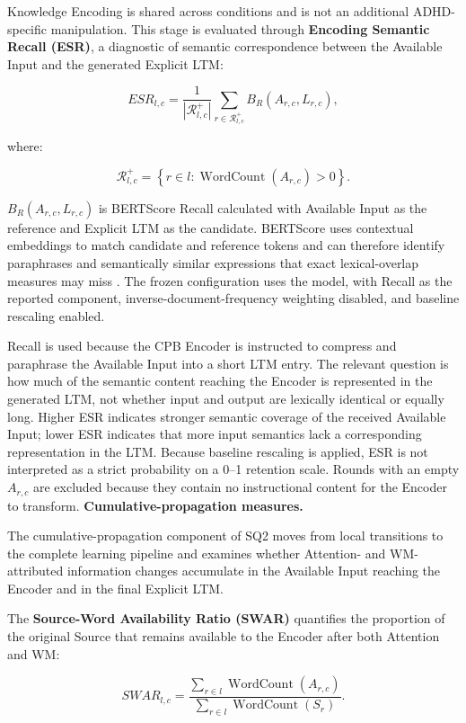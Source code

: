 Knowledge Encoding is shared across conditions and is not an additional ADHD-specific manipulation. This stage is evaluated through \textbf{Encoding Semantic Recall (ESR)}, a diagnostic of semantic correspondence between the Available Input and the generated Explicit LTM:

\[
ESR_{l,c}
=
\frac{1}{|\mathcal R^+_{l,c}|}
\sum_{r\in\mathcal R^+_{l,c}}
B_R(A_{r,c},L_{r,c}),
\]

where:

\[
\mathcal R^+_{l,c}
=
\left\{
r\in l:
\operatorname{WordCount}(A_{r,c})>0
\right\}.
\]

$B_R(A_{r,c},L_{r,c})$ is BERTScore Recall calculated with Available Input as the reference and Explicit LTM as the candidate. BERTScore uses contextual embeddings to match candidate and reference tokens and can therefore identify paraphrases and semantically similar expressions that exact lexical-overlap measures may miss \cite{zhang2019bertscore}. The frozen configuration uses the  model, with Recall as the reported component, inverse-document-frequency weighting disabled, and baseline rescaling enabled.

Recall is used because the CPB Encoder is instructed to compress and paraphrase the Available Input into a short LTM entry. The relevant question is how much of the semantic content reaching the Encoder is represented in the generated LTM, not whether input and output are lexically identical or equally long. Higher ESR indicates stronger semantic coverage of the received Available Input; lower ESR indicates that more input semantics lack a corresponding representation in the LTM. Because baseline rescaling is applied, ESR is not interpreted as a strict probability on a 0--1 retention scale. Rounds with an empty $A_{r,c}$ are excluded because they contain no instructional content for the Encoder to transform.
\textbf{Cumulative-propagation measures.}

The cumulative-propagation component of SQ2 moves from local transitions to the complete learning pipeline and examines whether Attention- and WM-attributed information changes accumulate in the Available Input reaching the Encoder and in the final Explicit LTM.

The \textbf{Source-Word Availability Ratio (SWAR)} quantifies the proportion of the original Source that remains available to the Encoder after both Attention and WM:

\[
SWAR_{l,c}
=
\frac{
\sum_{r\in l}\operatorname{WordCount}(A_{r,c})
}{
\sum_{r\in l}\operatorname{WordCount}(S_r)
}.
\]

